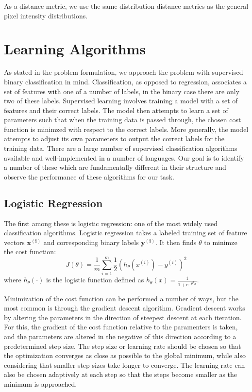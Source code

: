 As a distance metric, we use the same distribution distance metrics as the general pixel intensity distributions.


\section{Learning Algorithms}

As stated in the problem formulation, we approach the problem with supervised binary classification in mind.
Classification, as opposed to regression, associates a set of features with one of a number of labels, in the binary case there are only two of these labels.
Supervised learning involves training a model with a set of features and their correct labels.
The model then attempts to learn a set of parameters such that when the training data is passed through, the chosen cost function is minimzed with respect to the correct labels.
More generally, the model attempts to adjust its own parameters to output the correct labels for the training data.
There are a large number of supervised classification algorithms available and well-implemented in a number of languages.
Our goal is to identify a number of these which are fundamentally different in their structure and observe the performance of these algorithms for our task.


\subsection{Logistic Regression}

The first among these is logistic regression: one of the most widely used classification algorithms.
Logistic regression takes a labeled training set of feature vectors $\mathbf{x^{(i)}}$ and corresponding binary labels $\mathbf{y^{(i)}}$.
It then finds $\theta$ to minimze the cost function:
\begin{equation}
J(\theta) = \frac{1}{m} \sum_{i=1}^m\frac{1}{2} \left( h_\theta \left( x^{(i)} \right) - y^{(i)} \right)^2
\end{equation}
where $h_\theta (\cdot)$ is the logistic function defined as $h_\theta(x) = \frac{1}{1+e^{-\theta^Tx}}$.

Minimization of the cost function can be performed a number of ways, but the most common is through the gradient descent algorithm.
Gradient descent works by altering the parameters in the direction of steepest descent at each iteration.
For this, the gradient of the cost function relative to the paramenters is taken, and the parameters are altered in the negative of this direction according to a predetermined step size.
The step size or learning rate should be chosen so that the optimization converges as close as possible to the global minimum, while also considering that smaller step sizes take longer to converge.
The learning rate can also be chosen adaptively at each step so that the steps become smaller as the minimum is approached.

